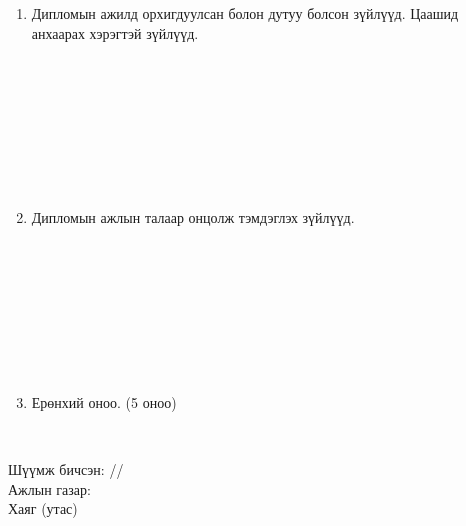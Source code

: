 \begin{titlepage}
\begin{enumerate}
\begin{center}
\dotfill \\[0.1cm]
\dotfill \\[0.1cm]
\dotfill \\[0.1cm]
\dotfill \\[0.1cm]
\dotfill \\[0.1cm]
\dotfill \\[0.1cm]
\dotfill \\[0.4cm]
\end{center}
\item Дипломын ажилд орхигдуулсан болон дутуу болсон зүйлүүд. Цаашид анхаарах хэрэгтэй зүйлүүд.
\begin{center}
\dotfill \\[0.1cm]
\dotfill \\[0.1cm]
\dotfill \\[0.1cm]
\dotfill \\[0.1cm]
\dotfill \\[0.1cm]
\dotfill \\[0.1cm]
\dotfill \\[0.4cm]
\end{center}
\item Дипломын ажлын талаар онцолж тэмдэглэх зүйлүүд.
\begin{center}
\dotfill \\[0.1cm]
\dotfill \\[0.1cm]
\dotfill \\[0.1cm]
\dotfill \\[0.1cm]
\dotfill \\[0.1cm]
\dotfill \\[0.1cm]
\dotfill \\[0.4cm]
\end{center}
\item Ерөнхий оноо. (5 оноо)
\begin{center}
\dotfill \\[1cm]
\end{center}
\end{enumerate}
Шүүмж бичсэн: \makebox[3cm]{\dotfill} /\readname/ \\[0.5cm]
Ажлын газар: \dotfill \\[0.5cm]
Хаяг (утас) \makebox[5cm]{\dotfill}
\end{titlepage}
